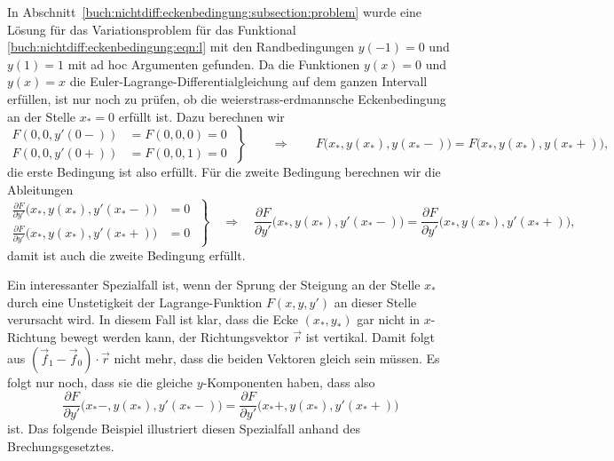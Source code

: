 \begin{beispiel}
In Abschnitt~\ref{buch:nichtdiff:eckenbedingung:subsection:problem}
wurde eine Lösung für das Variationsproblem für das Funktional
\eqref{buch:nichtdiff:eckenbedingung:eqn:l} mit den Randbedingungen
$y(-1)=0$ und $y(1)=1$ mit ad hoc Argumenten gefunden.
Da die Funktionen $y(x)=0$ und $y(x)=x$ die
Euler-Lagrange-Differentialgleichung auf dem ganzen Intervall
erfüllen, ist nur noch zu prüfen, ob die weierstrass-erdmannsche
Eckenbedingung an der Stelle $x_*=0$ erfüllt ist.
Dazu berechnen wir 
\begin{equation}
\left.
\begin{aligned}
F(0,0,y'(0-))&=F(0,0,0)=0
\\
F(0,0,y'(0+))&=F(0,0,1)=0
\end{aligned}
\;
\right\}
\qquad\Rightarrow\qquad
F\bigl(x_*,y(x_*),y(x_*-)\bigr)=F\bigl(x_*,y(x_*),y(x_*+)\bigr),
\end{equation}
die erste Bedingung ist also erfüllt.
Für die zweite Bedingung berechnen wir die Ableitungen
\[
\left.
\begin{aligned}
\frac{\partial F}{\partial y'}\bigl(x_*,y(x_*),y'(x_*-)\bigr)
&=
0
\\
\frac{\partial F}{\partial y'}\bigl(x_*,y(x_*),y'(x_*+)\bigr)
&=
0
\end{aligned}
\;\right\}
\quad\Rightarrow\quad
\frac{\partial F}{\partial y'}\bigl(x_*,y(x_*),y'(x_*-)\bigr)
=
\frac{\partial F}{\partial y'}\bigl(x_*,y(x_*),y'(x_*+)\bigr),
\]
damit ist auch die zweite Bedingung erfüllt.
\end{beispiel}

Ein interessanter Spezialfall ist, wenn der Sprung der Steigung
an der Stelle $x_*$ durch eine Unstetigkeit der Lagrange-Funktion
$F(x,y,y')$ an dieser Stelle verursacht wird.
In diesem Fall ist klar, dass die Ecke $(x_*,y_*)$ gar nicht in
$x$-Richtung bewegt werden kann, der Richtungsvektor $\vec{r}$ ist
vertikal.
Damit folgt aus $(\vec{f}_1-\vec{f}_0)\cdot\vec{r}$ nicht mehr,
dass die beiden Vektoren gleich sein müssen.
Es folgt nur noch, dass sie die gleiche $y$-Komponenten haben,
dass also
\begin{equation}
\frac{\partial F}{\partial y'}\bigl(x_*-,y(x_*),y'(x_*-)\bigr)
=
\frac{\partial F}{\partial y'}\bigl(x_*+,y(x_*),y'(x_*+)\bigr)
\label{buch:nichtdiff:eckenbedingung:eqn:we0}
\end{equation}
ist.
Das folgende Beispiel illustriert diesen Spezialfall anhand des
Brechungsgesetztes.

